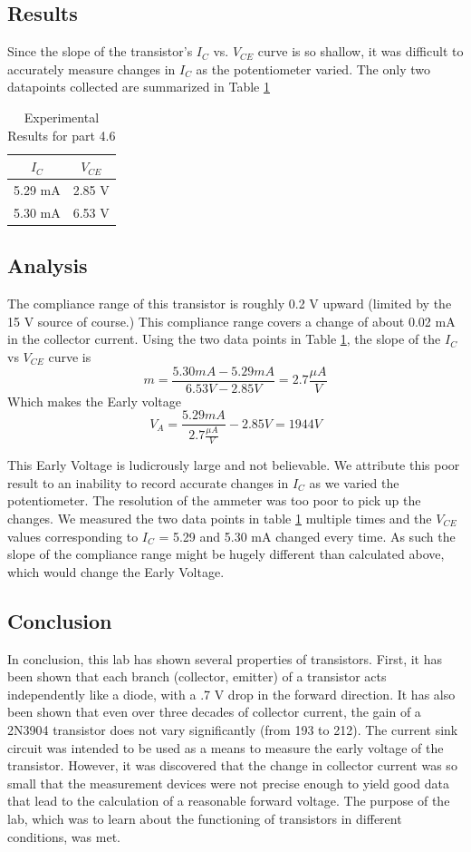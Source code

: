 \documentclass[12pt,letterpaper]{report}
\begin{document}
\subsection*{Results}
Since the slope of the transistor's $I_C$ vs. $V_{CE}$ curve is so shallow, it was difficult to accurately measure changes in $I_C$ as the potentiometer varied. The only two datapoints collected are summarized in Table \ref{table:4-6_results}

\begin{table}[ht]
\caption{Experimental Results for part 4.6} %
\centering 
    \begin{tabular}{| c | c |}
    \hline  
    $I_C$ & $V_{CE}$\\
    \hline
    5.29 mA & 2.85 V\\
    5.30 mA & 6.53 V\\
    \hline
    \end{tabular}
    \label{table:4-6_results}
\end{table}

\subsection*{Analysis}
The compliance range of this transistor is roughly 0.2 V upward (limited by the 15 V source of course.) This compliance range covers a change of about 0.02 mA in the collector current. Using the two data points in Table \ref{table:4-6_results}, the slope of the $I_C$ vs $V_{CE}$ curve is
$$
m = \frac{5.30 mA - 5.29 mA}{6.53V - 2.85V} = 2.7 \frac{\mu A}{V}
$$
Which makes the Early voltage
$$
V_A = \frac{5.29 mA}{2.7 \frac{\mu A}{V}} - 2.85 V = 1944 V
$$

This Early Voltage is ludicrously large and not believable. We attribute this poor result to an inability to record accurate changes in $I_C$ as we varied the potentiometer. The resolution of the ammeter was too poor to pick up the changes. We measured the two data points in table \ref{table:4-6_results} multiple times and the $V_{CE}$ values corresponding to $I_C$ = 5.29 and 5.30 mA changed every time. As such the slope of the compliance range might be hugely different than calculated above, which would change the Early Voltage.

\subsection*{Conclusion}

In conclusion, this lab has shown several properties of transistors. First, it has been shown that each branch (collector, emitter) of a transistor acts independently like a diode, with a .7 V drop in the forward direction. It has also been shown that even over three decades of collector current, the gain of a 2N3904 transistor does not vary significantly (from 193 to 212). The current sink circuit was intended to be used as a means to measure the early voltage of the transistor. However, it was discovered that the change in collector current was so small that the measurement devices were not precise enough to yield good data that lead to the calculation of a reasonable forward voltage. The purpose of the lab, which was to learn about the functioning of transistors in different conditions, was met.
\end{document}
